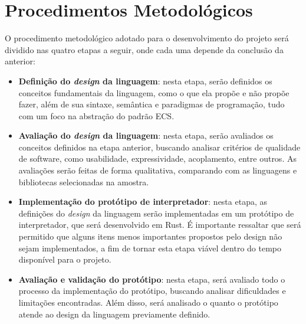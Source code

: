 \section{Procedimentos Metodológicos}

O procedimento metodológico adotado para o desenvolvimento do projeto será dividido nas quatro etapas a seguir, onde cada uma depende da conclusão da anterior:

\begin{itemize}
    \item \textbf{Definição do \textit{design} da linguagem}: nesta etapa, serão definidos os conceitos fundamentais da linguagem, como o que ela propõe e não propõe fazer, além de sua sintaxe, semântica e paradigmas de programação, tudo com um foco na abstração do padrão ECS.
    \item \textbf{Avaliação do \textit{design} da linguagem}: nesta etapa, serão avaliados os conceitos definidos na etapa anterior, buscando analisar critérios de qualidade de software, como usabilidade, expressividade, acoplamento, entre outros. As avaliações serão feitas de forma qualitativa, comparando com as linguagens e bibliotecas selecionadas na amostra.
    \item \textbf{Implementação do protótipo de interpretador}: nesta etapa, as definições do \textit{design} da linguagem serão implementadas em um protótipo de interpretador, que será desenvolvido em Rust. É importante ressaltar que será permitido que alguns itens menos importantes propostos pelo design não sejam implementados, a fim de tornar esta etapa viável dentro do tempo disponível para o projeto.
    \item \textbf{Avaliação e validação do protótipo}: nesta etapa, será avaliado todo o processo da implementação do protótipo, buscando analisar dificuldades e limitações encontradas. Além disso, será analisado o quanto o protótipo atende ao design da linguagem previamente definido.
\end{itemize}
